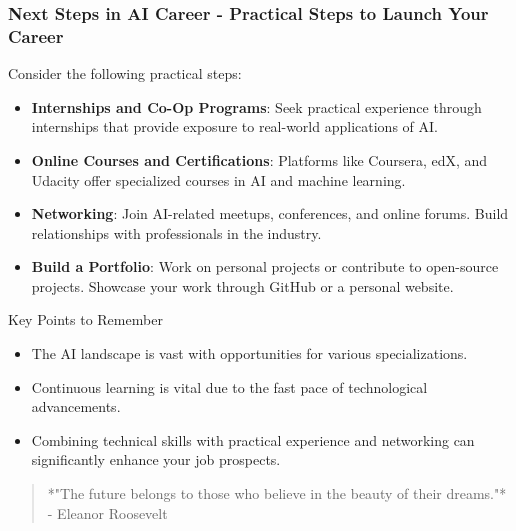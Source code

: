 \documentclass[aspectratio=169]{beamer}
\begin{document}
\begin{frame}[fragile]
    \frametitle{Next Steps in AI Career - Practical Steps to Launch Your Career}
    Consider the following practical steps:
    \begin{itemize}
        \item \textbf{Internships and Co-Op Programs}: Seek practical experience through internships that provide exposure to real-world applications of AI.
        \item \textbf{Online Courses and Certifications}: Platforms like Coursera, edX, and Udacity offer specialized courses in AI and machine learning.
        \item \textbf{Networking}: Join AI-related meetups, conferences, and online forums. Build relationships with professionals in the industry.
        \item \textbf{Build a Portfolio}: Work on personal projects or contribute to open-source projects. Showcase your work through GitHub or a personal website.
    \end{itemize}

    \begin{block}{Key Points to Remember}
        \begin{itemize}
            \item The AI landscape is vast with opportunities for various specializations.
            \item Continuous learning is vital due to the fast pace of technological advancements.
            \item Combining technical skills with practical experience and networking can significantly enhance your job prospects.
        \end{itemize}
    \end{block}

    \begin{quote}
        *"The future belongs to those who believe in the beauty of their dreams."* - Eleanor Roosevelt
    \end{quote}
\end{frame}
\end{document}
